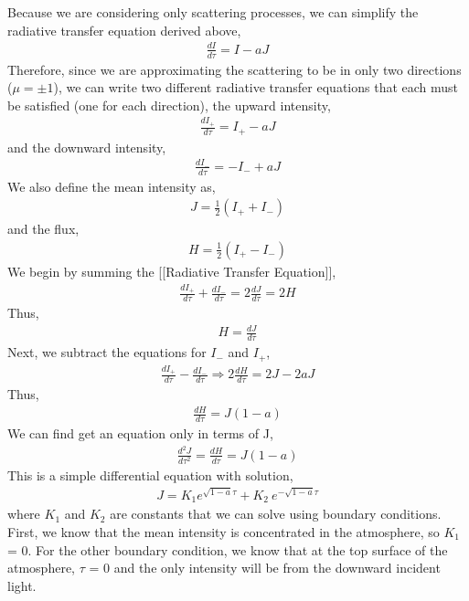 \documentclass{article}
\begin{document}
Because we are considering only scattering processes, we can simplify the radiative transfer equation derived above,
\begin{align}
\frac{dI}{d \tau} = I - aJ
\end{align}
Therefore, since we are approximating the scattering to be in only two directions ($\mu = \pm 1$), we can write two different radiative transfer equations that each must be satisfied (one for each direction), the upward intensity,
\begin{align}
\frac{dI_+}{d \tau} = I_+ - aJ
\end{align}
and the downward intensity,
\begin{align}
\frac{dI_-}{d \tau} = -I_- + aJ
\end{align}
We also define the mean intensity as,
\begin{align}
J = \frac{1}{2}(I_{+} + I_{-})
\end{align}
and the flux,
\begin{align}
H =\frac{1}{2 }(I_{+} - I_{-})
\end{align}
 We begin by summing the [[Radiative Transfer Equation]],
 \begin{align}
 \frac{dI_+}{d \tau} + \frac{dI_-}{d \tau} = 2 \frac{dJ}{d \tau} = 2H
 \end{align}
 Thus,
 \begin{align}
 H = \frac{dJ}{d \tau}
 \end{align}
 Next, we subtract the equations for $I_-$ and $I_+$,
 \begin{align}
  \frac{dI_+}{d \tau} - \frac{dI_-}{d \tau} \Rightarrow 2 \frac{dH}{d \tau} = 2J - 2aJ
 \end{align}
 Thus,
 \begin{align}
 \frac{dH}{d \tau} = J(1-a)
 \end{align}
 We can find get an equation only in terms of J,
 \begin{align}
 \frac{d^2J}{d \tau^2} = \frac{dH}{d \tau} = J(1-a)
 \end{align}
 This is a simple differential equation with solution,
 \begin{align}
 J = K_1 e^{\sqrt{1-a}\tau} + K_2 \ e^{-\sqrt{1-a}\tau}
 \end{align}
 where $K_1$ and $K_2$ are constants that we can solve using boundary conditions. First, we know that the mean intensity is concentrated in the atmosphere, so $K_1$ = 0.
 For the other boundary condition, we know that at the top surface of the atmosphere, $\tau$ = 0 and the only intensity will be from the downward incident light.
\end{document}
